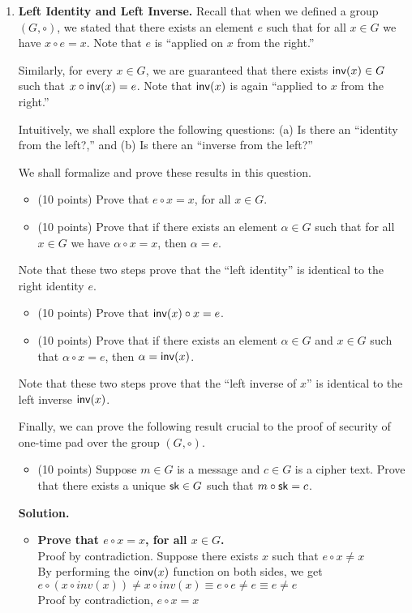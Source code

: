 \documentclass[11pt]{article}
\newcommand{\nextoddpage}{\checkoddpage\ifoddpage{\ \newpage\ \newpage}\else{\ \newpage}\fi}
\begin{document}
\begin{enumerate}
  
\nextoddpage 
\item {\bfseries Left Identity and Left Inverse.} 
  Recall that when we defined a group $(G,\circ)$, we stated that there exists an element $e$ such that for all $x\in G$ we have $x\circ e=x$. 
  Note that $e$ is ``applied on $x$ from the right.'' 
  
  Similarly, for every $x\in G$, we are guaranteed that there exists $\mathsf{inv}(x)\in G$ such that $x\circ\mathsf{inv}(x)=e$. 
  Note that $\mathsf{inv}(x)$ is again ``applied to $x$ from the right.'' 
  
  Intuitively, we shall explore the following questions: (a) Is there an ``identity from the left?,'' and (b) Is there an ``inverse from the left?'' 
  
  We shall formalize and prove these results in this question. 
  \begin{itemize}
  \item (10 points) Prove that $e\circ x = x$, for all $x\in G$. 
  \item (10 points) Prove that if there exists an element $\alpha\in G$ such that for all $x\in G$ we have $\alpha\circ x=x$, then $\alpha = e$. 
  \end{itemize}
  Note that these two steps prove that the ``left identity'' is identical to the right identity $e$. 
  
  
  \begin{itemize}
  \item (10 points) Prove that $\mathsf{inv}(x)\circ x = e$. 
  \item (10 points) Prove that if there exists an element $\alpha\in G$ and $x\in G$ such that $\alpha\circ x=e$, then $\alpha=\mathsf{inv}(x)$. 
  \end{itemize}
  Note that these two steps prove that the ``left inverse of $x$'' is identical to the left inverse $\mathsf{inv}(x)$. 
  
  Finally, we can prove the following result crucial to the proof of security of one-time pad over the group $(G,\circ)$. 
  \begin{itemize}
  \item (10 points) Suppose $m\in G $ is a message and $c\in G$ is a cipher text. 
    Prove that there exists a unique $\mathsf{sk}\in G$ such that $m\circ \mathsf{sk} = c$. 
  \end{itemize}
  
  {\bfseries Solution.} 
  \begin{itemize} 
  \item {\bfseries Prove that $e\circ x = x$, for all $x\in G$.} \\
  Proof by contradiction. Suppose there exists $x$ such that $e \circ x \neq x$ \\
  By performing the $\circ \mathsf{inv}(x)$ function on both sides, we get $e \circ (x \circ inv(x)) \neq x \circ inv(x) \equiv e \circ e \neq e \equiv e \neq e $ \\
  Proof by contradiction, $e\circ x = x$
  

\end{itemize}
\end{enumerate}
\end{document}
